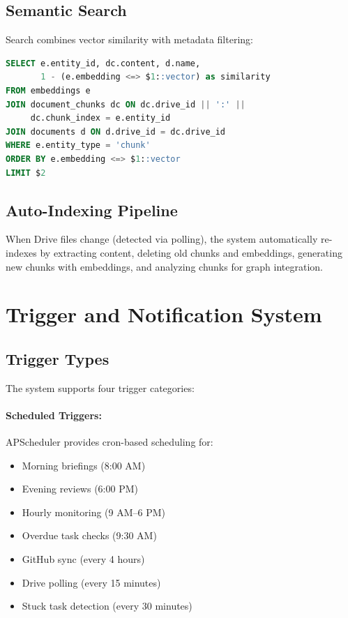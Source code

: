 \documentclass[11pt,a4paper]{article}
\begin{document}
\subsection{Semantic Search}

Search combines vector similarity with metadata filtering:

\begin{lstlisting}[language=SQL]
SELECT e.entity_id, dc.content, d.name,
       1 - (e.embedding <=> $1::vector) as similarity
FROM embeddings e
JOIN document_chunks dc ON dc.drive_id || ':' ||
     dc.chunk_index = e.entity_id
JOIN documents d ON d.drive_id = dc.drive_id
WHERE e.entity_type = 'chunk'
ORDER BY e.embedding <=> $1::vector
LIMIT $2
\end{lstlisting}

\subsection{Auto-Indexing Pipeline}

When Drive files change (detected via polling), the system automatically re-indexes by extracting content, deleting old chunks and embeddings, generating new chunks with embeddings, and analyzing chunks for graph integration.

\section{Trigger and Notification System}
\label{sec:triggers}

\subsection{Trigger Types}

The system supports four trigger categories:

\paragraph{Scheduled Triggers:} APScheduler provides cron-based scheduling for:
\begin{itemize}
    \item Morning briefings (8:00 AM)
    \item Evening reviews (6:00 PM)
    \item Hourly monitoring (9 AM--6 PM)
    \item Overdue task checks (9:30 AM)
    \item GitHub sync (every 4 hours)
    \item Drive polling (every 15 minutes)
    \item Stuck task detection (every 30 minutes)
\end{itemize}
\end{document}
